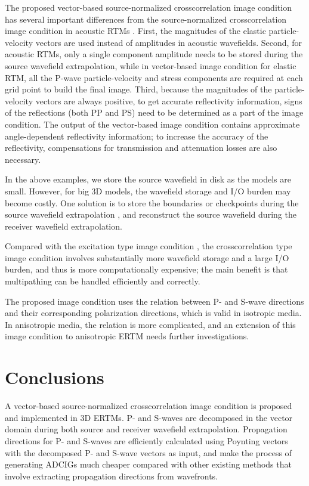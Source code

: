 \documentclass[manuscript,ulem,graphix,revised]{geophysics}
\begin{document}
The proposed vector-based source-normalized crosscorrelation image condition has several important differences from the source-normalized crosscorrelation image condition in acoustic RTMs \citep{kaelin06}. First, the magnitudes of the elastic particle-velocity vectors are used instead of amplitudes in acoustic wavefields. Second, for acoustic RTMs, only a single component amplitude needs to be stored during the source wavefield extrapolation, while in vector-based image condition for elastic RTM, all the P-wave particle-velocity and stress components are required at each grid point to build the final image. Third, because the magnitudes of the particle-velocity vectors are always positive, to get accurate reflectivity information, signs of the reflections (both PP and PS) need to be determined as a part of the image condition. The output of the vector-based image condition contains approximate angle-dependent reflectivity information; to increase the accuracy of the reflectivity, compensations for transmission and attenuation losses \citep{deng07,deng08} are also necessary.

In the above examples, we store the source wavefield in disk as the models are small. However, for big 3D models, the wavefield storage and I/O burden may become costly. One solution is to store the boundaries or checkpoints during the source wavefield extrapolation \citep{bao15}, and reconstruct the source wavefield during the receiver wavefield extrapolation.

Compared with the excitation type image condition \citep{wenlong_vct15,wenlong_3d16}, the crosscorrelation type image condition involves substantially more wavefield storage and a large I/O burden, and thus is more computationally expensive; the main benefit is that multipathing can be handled efficiently and correctly.

The proposed image condition uses the relation between P- and S-wave directions and their corresponding polarization directions, which is valid in isotropic media. In anisotropic media, the relation is more complicated, and an extension of this image condition to anisotropic ERTM needs further investigations.


\section{Conclusions}

A vector-based source-normalized crosscorrelation image condition is proposed and implemented in 3D ERTMs. P- and S-waves are decomposed in the vector domain during both source and receiver wavefield extrapolation. Propagation directions for P- and S-waves are efficiently calculated using Poynting vectors with the decomposed P- and S-wave vectors as input, and make the process of generating ADCIGs much cheaper compared with other existing methods that involve extracting propagation directions from wavefronts. 
\end{document}

